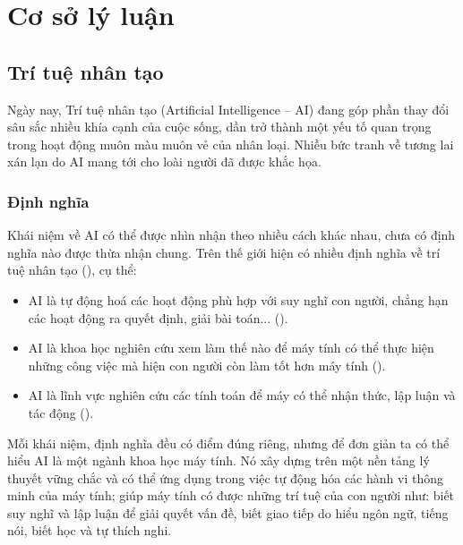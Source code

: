 \chapter{Cơ sở lý luận}

\section{Trí tuệ nhân tạo}
Ngày nay, Trí tuệ nhân tạo (Artificial Intelligence – AI) đang góp phần thay đổi sâu sắc nhiều khía cạnh của cuộc sống, dần trở thành một yếu tố quan trọng trong hoạt động muôn màu muôn vẻ của nhân loại. Nhiều bức tranh về tương lai xán lạn do AI mang tới cho loài người đã được khắc họa.\par

\subsection{Định nghĩa}
Khái niệm về AI có thể được nhìn nhận theo nhiều cách khác nhau, chưa có định nghĩa nào được thừa nhận chung. Trên thế giới hiện có nhiều định nghĩa về trí tuệ nhân tạo (\cite{nguyen2018tri}), cụ thể:
\begin{itemize}
	\item AI là tự động hoá các hoạt động phù hợp với suy nghĩ con người, chẳng hạn các hoạt động ra quyết định, giải bài toán... (\cite{bellman1978introduction}).
	\item AI là khoa học nghiên cứu xem làm thế nào để máy tính có thể thực hiện những công việc mà hiện con người còn làm tốt hơn máy tính (\cite{rich1991artificial}).
	\item AI là lĩnh vực nghiên cứu các tính toán để máy có thể nhận thức, lập luận và tác động (\cite{salin1992machine}).
\end{itemize}\par
Mỗi khái niệm, định nghĩa đều có điểm đúng riêng, nhưng để đơn giản ta có thể hiểu AI là một ngành khoa học máy tính. Nó xây dựng trên một nền tảng lý thuyết vững chắc và có thể ứng dụng trong việc tự động hóa các hành vi thông minh của máy tính; giúp máy tính có được những trí tuệ của con người như: biết suy nghĩ và lập luận để giải quyết vấn đề, biết giao tiếp do hiểu ngôn ngữ, tiếng nói, biết học và tự thích nghi.


